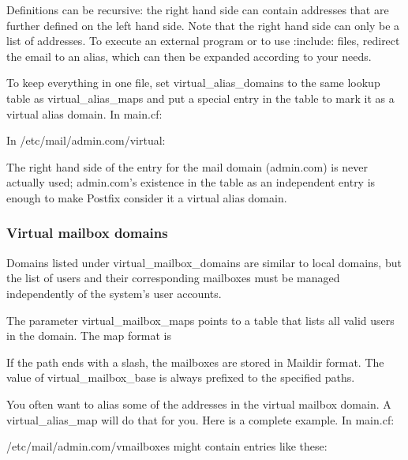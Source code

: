 Definitions can be recursive: the right hand side can contain addresses
that are further defined on the left hand side. Note that the right hand
side can only be a list of addresses. To execute an external program or
to use {:include:} files, redirect the email to an alias, which can then
be expanded according to your needs.

To keep everything in one file, set {virtual\_alias\_domains} to the
same lookup table as {virtual\_alias\_maps} and put a special entry in
the table to mark it as a virtual alias domain. In
{main.cf}:\protect\hypertarget{part0026_split_062.htmlux5cux23_idIndexMarker2724}{}{}


In {/etc/mail/admin.com/virtual}:


The right hand side of the entry for the mail domain (admin.com) is
never actually used; admin.com's existence in the table as an
independent entry is enough to make Postfix consider it a virtual alias
domain.

\subsubsection[Virtual mailbox
domains]{\texorpdfstring{\protect\hypertarget{part0026_split_062.htmlux5cux23_idTextAnchor1186}{}{}Virtual
mailbox domains}{Virtual mailbox domains}}

Domains listed under {virtual\_mailbox\_domains} are similar to local
domains, but the list of users and their corresponding mailboxes must be
managed independently of the system's user accounts.

The parameter {virtual\_mailbox\_maps} points to a table that lists all
valid users in the domain. The map format is


If the path ends with a slash, the mailboxes are stored in {Maildir}
format. The value of {virtual\_mailbox\_base} is always prefixed to the
specified paths.

You often want to alias some of the addresses in the virtual mailbox
domain. A {virtual\_alias\_map} will do that for you. Here is a complete
example. In
{main.cf}:\protect\hypertarget{part0026_split_062.htmlux5cux23_idIndexMarker2725}{}{}


{/etc/mail/admin.com/vmailboxes} might contain entries like these:

